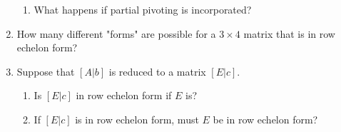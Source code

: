 \begin{enumerate}[leftmargin=*, label=\bfseries 2.1.\arabic*]
\begin{enumerate}[label=(\alph*)]
    \item What happens if partial pivoting is incorporated?
\end{enumerate}

\item How many different "forms" are possible for a \( 3 \times 4 \) matrix that is in row echelon form?

\item Suppose that \([A | b]\) is reduced to a matrix \([E | c]\).

\begin{enumerate}[label=(\alph*)]
    \item Is \([E | c]\) in row echelon form if \( E \) is?
    
    \item If \([E | c]\) is in row echelon form, must \( E \) be in row echelon form?
\end{enumerate}

\end{enumerate}


